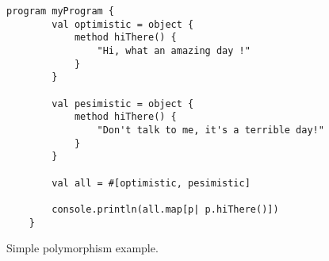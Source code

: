 
\begin{figure}[h]
 \centering
 \begin{lstlisting}[language=Wollok]
	program myProgram {
		val optimistic = object {
			method hiThere() {
				"Hi, what an amazing day !"
			}
		}

		val pesimistic = object {
			method hiThere() {
				"Don't talk to me, it's a terrible day!"
			}
		}
		
		val all = #[optimistic, pesimistic]
		
		console.println(all.map[p| p.hiThere()])
	}
 \end{lstlisting}
 
 \caption{\small Simple polymorphism example.}
 \label{fig:polymorphism}
\end{figure}
